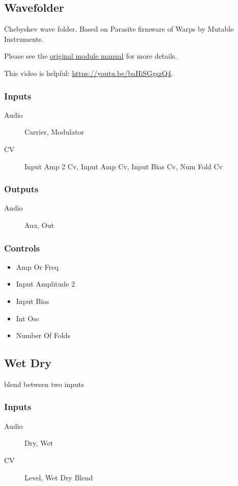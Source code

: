 \subsection{Wavefolder}

Chebyshev wave folder. Based on Parasite firmware of Warps by Mutable Instruments. 



Please see the \href{https://mqtthiqs.github.io/parasites/warps.html}{original module manual} for more details.

This video is helpful: \url{https://youtu.be/baHiSGgszQ4}.

\subsubsection{Inputs}
\begin{description}
\item [Audio] Carrier, Modulator
\item [CV] Input Amp 2 Cv, Input Amp Cv, Input Bias Cv, Num Fold Cv
\end{description}

\subsubsection{Outputs}
\begin{description}
\item [Audio] Aux, Out
\end{description}

\subsubsection{Controls}
\begin{itemize}
\item Amp Or Freq
\item Input Amplitude 2
\item Input Bias
\item Int Osc
\item Number Of Folds
\end{itemize}

\subsection{Wet Dry}

blend between two inputs



\subsubsection{Inputs}
\begin{description}
\item [Audio] Dry, Wet
\item [CV] Level, Wet Dry Blend
\end{description}

